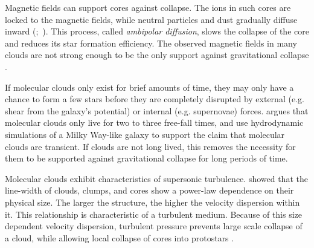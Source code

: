 Magnetic fields can support cores against collapse. The ions in such cores are locked to the magnetic fields, while neutral particles and dust gradually diffuse inward (\citet{Mestel_1956};~\citet{Shu_1983}). This process, called \textit{ambipolar diffusion}, slows the collapse of the core and reduces its star formation efficiency. The observed magnetic fields in many clouds are not strong enough to be the only support against gravitational collapse \cite{Crutcher_2012}.

If molecular clouds only exist for brief amounts of time, they may only have a chance to form a few stars before they are completely disrupted by external (e.g. shear from the galaxy's potential) or internal (e.g. supernovae) forces. \citet{Murray_2011} argues that molecular clouds only live for two to three free-fall times, and \citet{Dobbs_2013} use hydrodynamic simulations of a Milky Way-like galaxy to support the claim that molecular clouds are transient. If clouds are not long lived, this removes the necessity for them to be supported against gravitational collapse for long periods of time. 

Molecular clouds exhibit characteristics of supersonic turbulence. \citet{Larson81} showed that the line-width of clouds, clumps, and cores show a power-law dependence on their physical size. The larger the structure, the higher the velocity dispersion within it. This relationship is characteristic of a turbulent medium. Because of this size dependent velocity dispersion, turbulent pressure prevents large scale collapse of a cloud, while allowing local collapse of cores into protostars \cite{Mac_Low_2004}.



